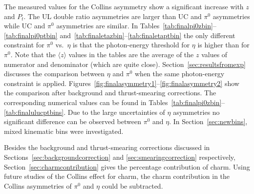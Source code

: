 The measured values for the Collins asymmetry show a significant increase with $z$ and $P_t$. The UL double ratio asymmetries are larger than UC and $\pi^0$ asymmetries while UC and $\pi^0$ asymmetries are similar. 
In Tables~\ref{tab:finalpi0zbin}--\ref{tab:finalpi0ptbin} and~\ref{tab:finaletazbin}--\ref{tab:finaletaptbin} the only different constraint for $\pi^0$ vs.~$\eta$ is that the photon-energy threshold for $\eta$ is higher than for $\pi^0$. 
Note that the $\langle z \rangle$ values in the tables are the average of the $z$ values of numerator and denominator (which are quite close).
Section~\ref{sec:resultsfromexp} discusses the comparison between $\eta$ and $\pi^0$ when the same photon-energy constraint is applied. 
Figures~\ref{fig:finalasymmetry1}--\ref{fig:finalasymmetry2} show the comparison after background and thrust-smearing corrections. 
The corresponding numerical values can be found in Tables~\ref{tab:finalpi0zbin}--\ref{tab:finalulucptbins}. 
Due to the large uncertainties of $\eta$ asymmetries no significant difference can be observed between $\pi^0$ and $\eta$. 
In Section~\ref{sec:newbins}, mixed kinematic bins were investigated. 

Besides the background and thrust-smearing corrections discussed in Sections~\ref{sec:backgroundcorrection} and \ref{sec:smearingcorrection} respectively, Section~\ref{sec:charmcontribution} gives the percentage contribution of charm. Using future studies of the Collins effect for charm, the charm contribution in the Collins asymmetries of $\pi^0$ and $\eta$ could be subtracted. 


